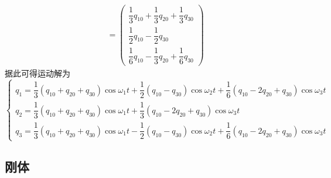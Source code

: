 \begin{solution}
\begin{align*}
	& = \begin{pmatrix} \dfrac13 q_{10} + \dfrac13 q_{20} + \dfrac13 q_{30} \\[1.5ex] \dfrac12 q_{10} - \dfrac12 q_{30} \\[1.5ex] \dfrac16 q_{10} - \dfrac13 q_{20} + \dfrac16 q_{30} \end{pmatrix}
\end{align*}
据此可得运动解为
\begin{equation*}
\begin{cases}
	\displaystyle q_1 = \dfrac13 \left(q_{10} + q_{20} + q_{30}\right) \cos \omega_1 t + \dfrac12\left(q_{10} - q_{30}\right) \cos \omega_2 t + \dfrac16 \left(q_{10} - 2q_{20} + q_{30}\right) \cos \omega_3 t \\[1.5ex]
	\displaystyle q_2 = \dfrac13 \left(q_{10} + q_{20} + q_{30}\right) \cos \omega_1 t + \dfrac13 \left(q_{10} - 2q_{20} + q_{30}\right) \cos \omega_3 t \\[1.5ex]
	\displaystyle q_3 = \dfrac13 \left(q_{10} + q_{20} + q_{30}\right) \cos \omega_1 t - \dfrac12 \left(q_{10} - q_{30}\right) \cos \omega_2 t + \dfrac16 \left(q_{10} - 2q_{20} + q_{30}\right) \cos \omega_3 t
\end{cases}
\end{equation*}
\end{solution}

\subsection{刚体}

